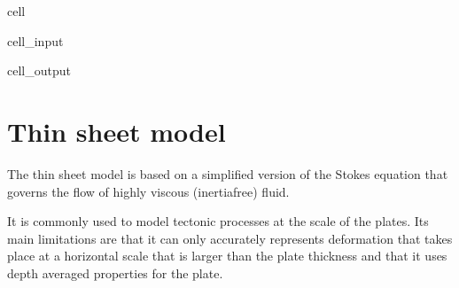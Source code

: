 \documentclass[letterpaper,10pt,english]{jupyterBook}
\begin{document}
\begin{sphinxuseclass}{cell}\begin{sphinxVerbatimInput}

\begin{sphinxuseclass}{cell_input}
\begin{sphinxVerbatim}[commandchars=\\\{\}]
   
\end{sphinxVerbatim}

\end{sphinxuseclass}\end{sphinxVerbatimInput}
\begin{sphinxVerbatimOutput}

\begin{sphinxuseclass}{cell_output}
\noindent{}

\end{sphinxuseclass}\end{sphinxVerbatimOutput}

\end{sphinxuseclass}
\sphinxstepscope


\section{Thin sheet model}
\label{\detokenize{thinsheet:thin-sheet-model}}\label{\detokenize{thinsheet::doc}}
\sphinxAtStartPar
The thin sheet model is based on a simplified version of the Stokes equation that governs the flow of highly viscous (inertia\sphinxhyphen{}free) fluid.

\sphinxAtStartPar
It is commonly used to model tectonic processes at the scale of the plates. Its main limitations are that it can only  accurately represents deformation that takes place at a horizontal scale that is larger than the plate thickness and that it uses depth averaged properties for the plate.
\end{document}
